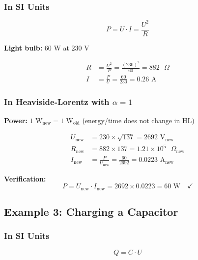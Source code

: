 	\subsubsection{In SI Units}
	
	\begin{equation}
		P = U \cdot I = \frac{U^2}{R}
	\end{equation}
	
	\textbf{Light bulb:} 60 W at 230 V
	
	\begin{align}
		R &= \frac{U^2}{P} = \frac{(230)^2}{60} = 882 \text{ }\Omega \\
		I &= \frac{P}{U} = \frac{60}{230} = 0.26 \text{ A}
	\end{align}
	
	\subsubsection{In Heaviside-Lorentz with $\alpha = 1$}
	
	\textbf{Power:} $1 \text{ W}_{\text{new}} = 1 \text{ W}_{\text{old}}$ (energy/time does not change in HL)
	
	\begin{align}
		U_{\text{new}} &= 230 \times \sqrt{137} = 2692 \text{ V}_{\text{new}} \\
		R_{\text{new}} &= 882 \times 137 = 1.21 \times 10^{5} \text{ }\Omega_{\text{new}} \\
		I_{\text{new}} &= \frac{P}{U_{\text{new}}} = \frac{60}{2692} = 0.0223 \text{ A}_{\text{new}}
	\end{align}
	
	\textbf{Verification:}
	\begin{equation}
		P = U_{\text{new}} \cdot I_{\text{new}} = 2692 \times 0.0223 = 60 \text{ W} \quad \checkmark
	\end{equation}
	
	\subsection{Example 3: Charging a Capacitor}
	
	\subsubsection{In SI Units}
	
	\begin{equation}
		Q = C \cdot U
	\end{equation}
	
